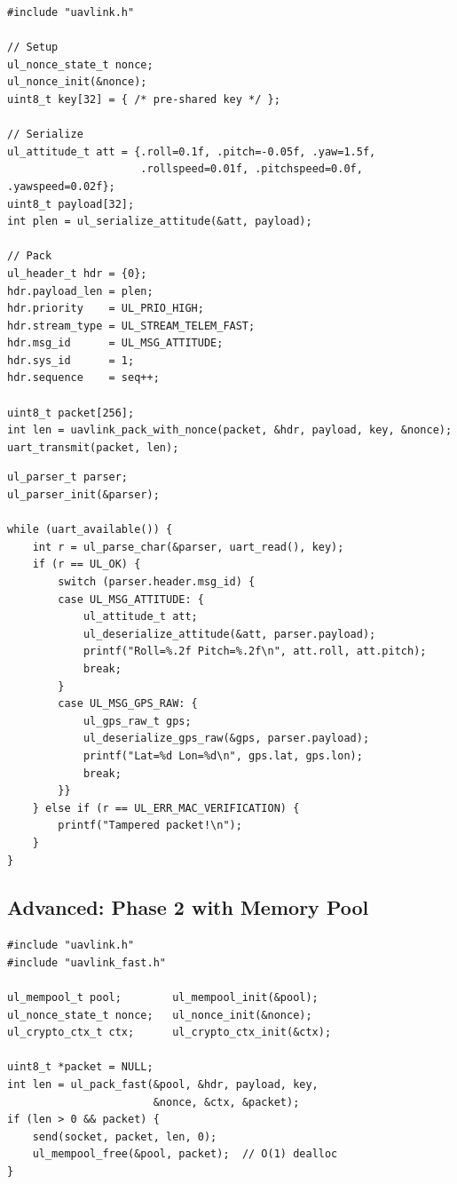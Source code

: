 \documentclass[11pt,a4paper]{article}
\begin{document}
\begin{lstlisting}[caption={Sending an attitude message over UART}]
#include "uavlink.h"

// Setup
ul_nonce_state_t nonce;
ul_nonce_init(&nonce);
uint8_t key[32] = { /* pre-shared key */ };

// Serialize
ul_attitude_t att = {.roll=0.1f, .pitch=-0.05f, .yaw=1.5f,
                     .rollspeed=0.01f, .pitchspeed=0.0f, .yawspeed=0.02f};
uint8_t payload[32];
int plen = ul_serialize_attitude(&att, payload);

// Pack
ul_header_t hdr = {0};
hdr.payload_len = plen;
hdr.priority    = UL_PRIO_HIGH;
hdr.stream_type = UL_STREAM_TELEM_FAST;
hdr.msg_id      = UL_MSG_ATTITUDE;
hdr.sys_id      = 1;
hdr.sequence    = seq++;

uint8_t packet[256];
int len = uavlink_pack_with_nonce(packet, &hdr, payload, key, &nonce);
uart_transmit(packet, len);
\end{lstlisting}

\begin{lstlisting}[caption={Receiving messages from a byte stream}]
ul_parser_t parser;
ul_parser_init(&parser);

while (uart_available()) {
    int r = ul_parse_char(&parser, uart_read(), key);
    if (r == UL_OK) {
        switch (parser.header.msg_id) {
        case UL_MSG_ATTITUDE: {
            ul_attitude_t att;
            ul_deserialize_attitude(&att, parser.payload);
            printf("Roll=%.2f Pitch=%.2f\n", att.roll, att.pitch);
            break;
        }
        case UL_MSG_GPS_RAW: {
            ul_gps_raw_t gps;
            ul_deserialize_gps_raw(&gps, parser.payload);
            printf("Lat=%d Lon=%d\n", gps.lat, gps.lon);
            break;
        }}
    } else if (r == UL_ERR_MAC_VERIFICATION) {
        printf("Tampered packet!\n");
    }
}
\end{lstlisting}

\newpage
\subsection{Advanced: Phase 2 with Memory Pool}

\begin{lstlisting}[caption={Using Phase 2 fast API with memory pool}]
#include "uavlink.h"
#include "uavlink_fast.h"

ul_mempool_t pool;        ul_mempool_init(&pool);
ul_nonce_state_t nonce;   ul_nonce_init(&nonce);
ul_crypto_ctx_t ctx;      ul_crypto_ctx_init(&ctx);

uint8_t *packet = NULL;
int len = ul_pack_fast(&pool, &hdr, payload, key,
                       &nonce, &ctx, &packet);
if (len > 0 && packet) {
    send(socket, packet, len, 0);
    ul_mempool_free(&pool, packet);  // O(1) dealloc
}
\end{lstlisting}
\end{document}
